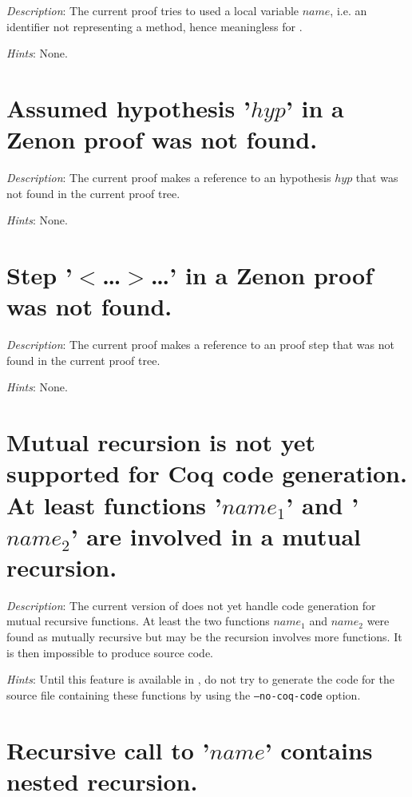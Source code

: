 {\em Description}: The current proof tries to used a local variable
$name$, i.e. an identifier not representing a method, hence
meaningless for {\zenon}.

{\em Hints}: None.



\section*{Assumed hypothesis '$hyp$' in a Zenon proof was not found.}

{\em Description}: The current proof makes a reference to an
hypothesis $hyp$ that was not found in the current proof tree.

{\em Hints}: None.



\section*{Step '$<$\ldots$>$\ldots' in a Zenon proof was not found.}

{\em Description}: The current proof makes a reference to an
proof step that was not found in the current proof tree.

{\em Hints}: None.


\section*{Mutual recursion is not yet supported for Coq code
  generation. At least functions '$name_1$' and '$name_2$' are
  involved in a mutual recursion.}

{\em Description}: The current version of {\focal} does not yet handle
{\coq} code generation for mutual recursive functions. At least the two
functions $name_1$ and $name_2$ were found as mutually recursive but
may be the recursion involves more functions. It is then impossible to
produce {\coq} source code.


{\em Hints}: Until this feature is available in {\focal}, do not try to
generate the {\coq} code for the source file containing these functions
by using the {\tt --no-coq-code} option.


\section*{Recursive call to '$name$' contains nested recursion.}

